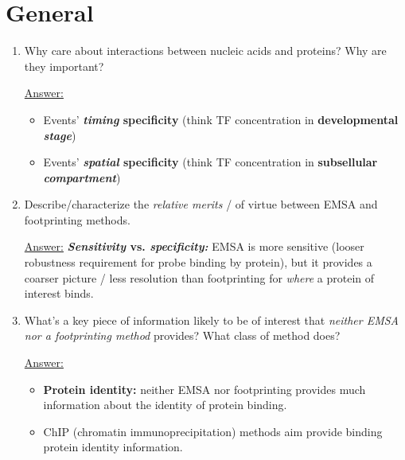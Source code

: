 \documentclass{article}
\newenvironment{QandA}{\begin{enumerate}[label=\bfseries Q\arabic*.]}
                       {\end{enumerate}}
\newenvironment{answered}{\par\normalfont\underline{Answer:}}{}
\begin{document}
\section{General}
\begin{QandA}
  \item{Why care about interactions between nucleic acids and proteins? Why are they important?}
    \begin{answered}
    \begin{itemize}
      \item{Events' \textbf{\textit{timing} specificity} (think TF concentration in \textbf{developmental \textit{stage}})}
      \item{Events' \textbf{\textit{spatial} specificity} (think TF concentration in \textbf{subsellular \textit{compartment}})}
    \end{itemize}
    \end{answered}
  \item{Describe/characterize the \textit{relative merits} /  of virtue between EMSA and footprinting methods.}
    \begin{answered}
    \textbf{\textit{Sensitivity} vs. \textit{specificity:}} EMSA is more sensitive (looser robustness requirement for probe binding by protein), but it provides a coarser picture / less resolution than footprinting for \textit{where} a protein of interest binds.
    \end{answered}
  \item{What's a key piece of information likely to be of interest that \textit{neither EMSA nor a footprinting method} provides? What class of method does?}
    \begin{answered}
    \begin{itemize}
      \item{\textbf{Protein identity:} neither EMSA nor footprinting provides much information about the identity of protein binding.}
      \item{ChIP (chromatin immunoprecipitation) methods aim provide binding protein identity information.}
    \end{itemize}
    \end{answered}
\end{QandA}
\end{document}
